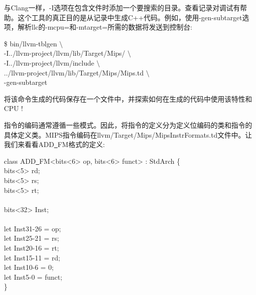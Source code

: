 与Clang一样，-I选项在包含文件时添加一个要搜索的目录。查看记录对调试有帮助。这个工具的真正目的是从记录中生成C++代码。例如，使用-gen-subtarget选项，解析llc的-mcpu=和-mtarget=所需的数据将发送到控制台:\par

\begin{tcolorbox}[colback=white,colframe=black]
\$ bin/llvm-tblgen $\setminus$ \\
\hspace*{0.5cm}-I../llvm-project/llvm/lib/Target/Mips/ $\setminus$ \\
\hspace*{0.5cm}-I../llvm-project/llvm/include $\setminus$ \\
\hspace*{0.5cm}../llvm-project/llvm/lib/Target/Mips/Mips.td $\setminus$ \\
\hspace*{0.5cm}-gen-subtarget
\end{tcolorbox}

将该命令生成的代码保存在一个文件中，并探索如何在生成的代码中使用该特性和CPU !\par

指令的编码通常遵循一些模式。因此，将指令的定义分为定义位编码的类和指令的具体定义类。MIPS指令编码在llvm/Target/Mips/MipsInstrFormats.td文件中。让我们来看看ADD\underline{~}FM格式的定义:\par

\begin{tcolorbox}[colback=white,colframe=black]
class ADD\underline{~}FM<bits<6> op, bits<6> funct> : StdArch \{ \\
\hspace*{0.5cm}	bits<5> rd; \\
\hspace*{0.5cm}	bits<5> rs; \\
\hspace*{0.5cm}	bits<5> rt; \\
\\
\hspace*{0.5cm}	bits<32> Inst; \\
\\
\hspace*{0.5cm}	let Inst{31-26} = op; \\
\hspace*{0.5cm}	let Inst{25-21} = rs; \\
\hspace*{0.5cm}	let Inst{20-16} = rt; \\
\hspace*{0.5cm}	let Inst{15-11} = rd; \\
\hspace*{0.5cm}	let Inst{10-6} = 0; \\
\hspace*{0.5cm}	let Inst{5-0} = funct; \\
\}
\end{tcolorbox}

